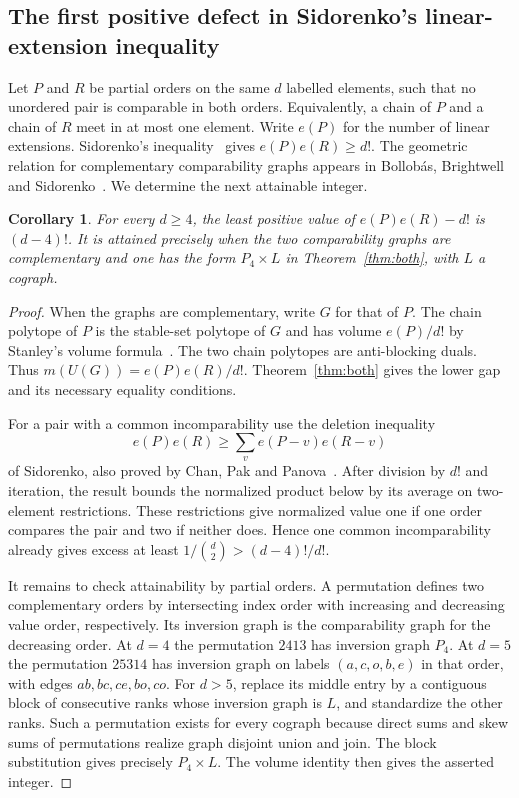 \documentclass[11pt,a4paper]{article}
\numberwithin{equation}{section}
\newtheorem{corollary}[theorem]{Corollary}
\begin{document}
\subsection{The first positive defect in Sidorenko's linear-extension inequality}
Let $P$ and $R$ be partial orders on the same $d$ labelled elements, such that no unordered pair is comparable in both orders. Equivalently, a chain of $P$ and a chain of $R$ meet in at most one element. Write $e(P)$ for the number of linear extensions. Sidorenko's inequality~\cite[Theorem 11]{Sid} gives $e(P)e(R)\ge d!$. The geometric relation for complementary comparability graphs appears in Bollob\'as, Brightwell and Sidorenko~\cite{BBS}. We determine the next attainable integer.
\begin{corollary}
For every $d\ge4$, the least positive value of $e(P)e(R)-d!$ is $(d-4)!$. It is attained precisely when the two comparability graphs are complementary and one has the form $P_4\times L$ in Theorem~\ref{thm:both}, with $L$ a cograph.
\end{corollary}
\begin{proof}
When the graphs are complementary, write $G$ for that of $P$. The chain polytope of $P$ is the stable-set polytope of $G$ and has volume $e(P)/d!$ by Stanley's volume formula~\cite{Stanley}. The two chain polytopes are anti-blocking duals. Thus $m(U(G))=e(P)e(R)/d!$. Theorem~\ref{thm:both} gives the lower gap and its necessary equality conditions.

For a pair with a common incomparability use the deletion inequality
\[
 e(P)e(R)\ge\sum_{v}e(P-v)e(R-v)
\]
of Sidorenko, also proved by Chan, Pak and Panova~\cite[Lemma 8.4]{CPP}. After division by $d!$ and iteration, the result bounds the normalized product below by its average on two-element restrictions. These restrictions give normalized value one if one order compares the pair and two if neither does. Hence one common incomparability already gives excess at least $1/\binom{d}{2}>(d-4)!/d!$.

It remains to check attainability by partial orders. A permutation defines two complementary orders by intersecting index order with increasing and decreasing value order, respectively. Its inversion graph is the comparability graph for the decreasing order. At $d=4$ the permutation $2413$ has inversion graph $P_4$. At $d=5$ the permutation $25314$ has inversion graph on labels $(a,c,o,b,e)$ in that order, with edges $ab,bc,ce,bo,co$. For $d>5$, replace its middle entry by a contiguous block of consecutive ranks whose inversion graph is $L$, and standardize the other ranks. Such a permutation exists for every cograph because direct sums and skew sums of permutations realize graph disjoint union and join. The block substitution gives precisely $P_4\times L$. The volume identity then gives the asserted integer.
\end{proof}
\end{document}
